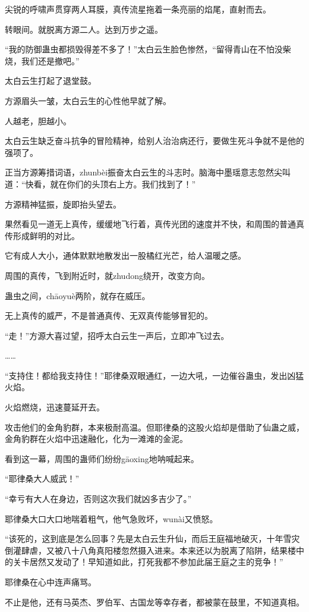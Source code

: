 \begin{this_body}
尖锐的呼啸声贯穿两人耳膜，真传流星拖着一条亮丽的焰尾，直射而去。

转眼间。就脱离方源二人。达到万步之遥。

“我的防御蛊虫都损毁得差不多了！”太白云生脸色惨然，“留得青山在不怕没柴烧，我们还是撤吧。”

太白云生打起了退堂鼓。

方源眉头一皱，太白云生的心性他早就了解。

人越老，胆越小。

太白云生缺乏奋斗抗争的冒险精神，给别人治治病还行，要做生死斗争就不是他的强项了。

正当方源筹措词语，zhunbèi振奋太白云生的斗志时。脑海中墨瑶意志忽然尖叫道：“快看，就在你们的头顶右上方。我们找到了！”

方源精神猛振，旋即抬头望去。

果然看见一道无上真传，缓缓地飞行着，真传光团的速度并不快，和周围的普通真传形成鲜明的对比。

它有成人大小，通体默默地散发出一股橘红光芒，给人温暖之感。

周围的真传，飞到附近时，就zhudong绕开，改变方向。

蛊虫之间，chāoyuè两阶，就存在威压。

无上真传的威严，不是普通真传、无双真传能够冒犯的。

“走！”方源大喜过望，招呼太白云生一声后，立即冲飞过去。

……

“支持住！都给我支持住！”耶律桑双眼通红，一边大吼，一边催谷蛊虫，发出凶猛火焰。

火焰燃烧，迅速蔓延开去。

攻击他们的金角豹群，本来极耐高温。但耶律桑的这股火焰却是借助了仙蛊之威，金角豹群在火焰中迅速融化，化为一滩滩的金泥。

看到这一幕，周围的蛊师们纷纷gāoxing地呐喊起来。

“耶律桑大人威武！”

“幸亏有大人在身边，否则这次我们就凶多吉少了。”

耶律桑大口大口地喘着粗气，他气急败坏，wunài又愤怒。

“该死的，这到底是怎么回事？先是太白云生升仙，而后王庭福地破灭，十年雪灾倒灌肆虐，又被八十八角真阳楼忽然摄入进来。本来还以为脱离了陷阱，结果楼中的关卡居然又发动了！早知道如此，打死我都不参加此届王庭之主的竞争！”

耶律桑在心中连声痛骂。

不止是他，还有马英杰、罗伯军、古国龙等幸存者，都被蒙在鼓里，不知道真相。


\end{this_body}
